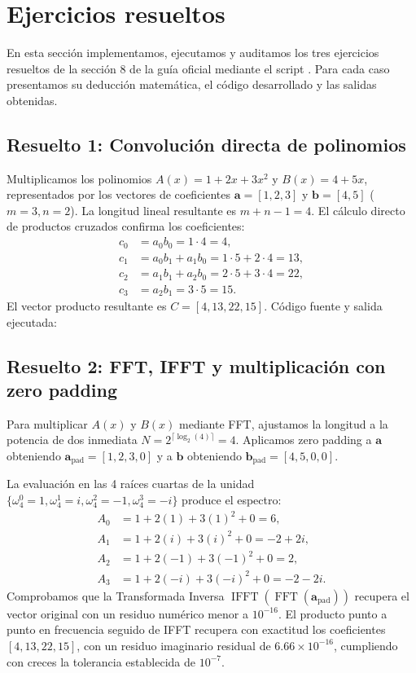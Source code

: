 \section{Ejercicios resueltos}
En esta sección implementamos, ejecutamos y auditamos los tres ejercicios resueltos de la sección 8 de la guía oficial mediante el script . Para cada caso presentamos su deducción matemática, el código desarrollado y las salidas obtenidas.

\subsection{Resuelto 1: Convolución directa de polinomios}
Multiplicamos los polinomios $A(x) = 1 + 2x + 3x^2$ y $B(x) = 4 + 5x$, representados por los vectores de coeficientes $\mathbf{a} = [1, 2, 3]$ y $\mathbf{b} = [4, 5]$ ($m=3, n=2$). La longitud lineal resultante es $m+n-1 = 4$. El cálculo directo de productos cruzados confirma los coeficientes:
\begin{align}
c_0 &= a_0 b_0 = 1 \cdot 4 = 4, \\
c_1 &= a_0 b_1 + a_1 b_0 = 1 \cdot 5 + 2 \cdot 4 = 13, \\
c_2 &= a_1 b_1 + a_2 b_0 = 2 \cdot 5 + 3 \cdot 4 = 22, \\
c_3 &= a_2 b_1 = 3 \cdot 5 = 15.
\end{align}
El vector producto resultante es $C = [4, 13, 22, 15]$. Código fuente y salida ejecutada:


\subsection{Resuelto 2: FFT, IFFT y multiplicación con zero padding}
Para multiplicar $A(x)$ y $B(x)$ mediante FFT, ajustamos la longitud a la potencia de dos inmediata $N = 2^{\lceil \log_2(4) \rceil} = 4$. Aplicamos zero padding a $\mathbf{a}$ obteniendo $\mathbf{a}_{\text{pad}} = [1, 2, 3, 0]$ y a $\mathbf{b}$ obteniendo $\mathbf{b}_{\text{pad}} = [4, 5, 0, 0]$.

La evaluación en las 4 raíces cuartas de la unidad $\{\omega_4^0 = 1, \omega_4^1 = i, \omega_4^2 = -1, \omega_4^3 = -i\}$ produce el espectro:
\begin{align}
A_0 &= 1 + 2(1) + 3(1)^2 + 0 = 6, \\
A_1 &= 1 + 2(i) + 3(i)^2 + 0 = -2 + 2i, \\
A_2 &= 1 + 2(-1) + 3(-1)^2 + 0 = 2, \\
A_3 &= 1 + 2(-i) + 3(-i)^2 + 0 = -2 - 2i.
\end{align}
Comprobamos que la Transformada Inversa $\operatorname{IFFT}(\operatorname{FFT}(\mathbf{a}_{\text{pad}}))$ recupera el vector original con un residuo numérico menor a $10^{-16}$. El producto punto a punto en frecuencia seguido de IFFT recupera con exactitud los coeficientes $[4, 13, 22, 15]$, con un residuo imaginario residual de $6.66 \times 10^{-16}$, cumpliendo con creces la tolerancia establecida de $10^{-7}$.



